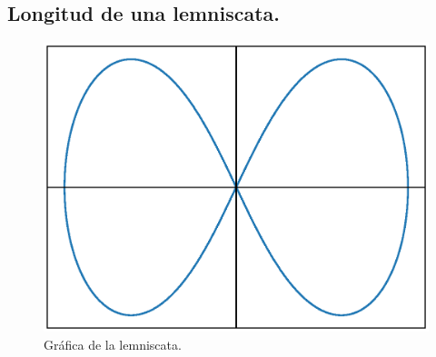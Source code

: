 \subsection*{Longitud de una lemniscata.}

\begin{figure}[!h]
    \centering
    \includegraphics[scale=0.75]{Imagenes/plot_leminscata_01.eps}
    \caption{Gráfica de la lemniscata.}
    \label{fig:figura_01}
\end{figure}
